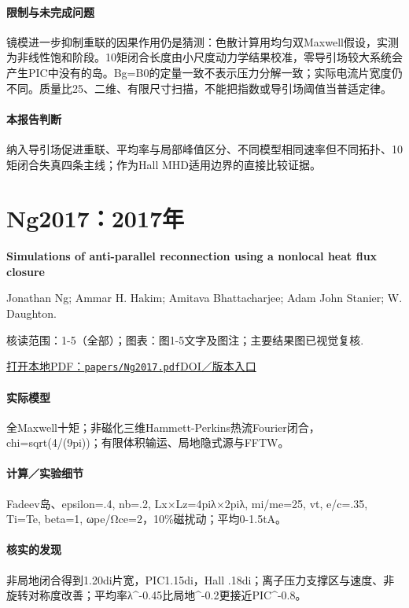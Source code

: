 \paragraph{限制与未完成问题}镜模进一步抑制重联的因果作用仍是猜测：色散计算用均匀双Maxwell假设，实测为非线性饱和阶段。10矩闭合长度由小尺度动力学结果校准，零导引场较大系统会产生PIC中没有的岛。Bg=B0的定量一致不表示压力分解一致；实际电流片宽度仍不同。质量比25、二维、有限尺寸扫描，不能把指数或导引场阈值当普适定律。

\paragraph{本报告判断}纳入导引场促进重联、平均率与局部峰值区分、不同模型相同速率但不同拓扑、10矩闭合失真四条主线；作为Hall MHD适用边界的直接比较证据。

\section{Ng2017：2017年}\label{paper:Ng2017}

\textbf{Simulations of anti-parallel reconnection using a nonlocal heat flux closure}\citep{Ng2017}\

Jonathan Ng;  Ammar H. Hakim;  Amitava Bhattacharjee;  Adam  John Stanier;  W. Daughton.

\textsf{核读范围：}1-5（全部）；\textsf{图表：}图1-5文字及图注；主要结果图已视觉复核.

\href{run:papers/Ng2017.pdf}{打开本地PDF：\texttt{papers/Ng2017.pdf}}\quad\href{https://doi.org/10.1063/1.4993195}{DOI／版本入口}

\paragraph{实际模型}全Maxwell十矩；非磁化三维Hammett-Perkins热流Fourier闭合，chi=sqrt(4/(9pi))；有限体积输运、局地隐式源与FFTW。

\paragraph{计算／实验细节}Fadeev岛、epsilon=.4, nb=.2, Lx×Lz=4piλ×2piλ, mi/me=25, vt, e/c=.35, Ti=Te, beta=1, ωpe/Ωce=2，10\%磁扰动；平均0-1.5tA。

\paragraph{核实的发现}非局地闭合得到1.20di片宽，PIC1.15di，Hall .18di；离子压力支撑区与速度、非旋转对称度改善；平均率λ\textasciicircum{}-0.45比局地\textasciicircum{}-0.2更接近PIC\textasciicircum{}-0.8。

